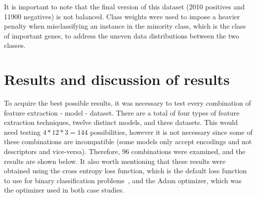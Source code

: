 It is important to note that the final version of this dataset (2010 positives and 11900 negatives) is not balanced. Class weights were used to impose a heavier penalty when misclassifying an instance in the minority class, which is the class of important genes, to address the uneven data distributions between the two classes.

\section{Results and discussion of results}

To acquire the best possible results, it was necessary to test every combination of feature extraction - model - dataset. There are a total of four types of feature extraction techniques, twelve distinct models, and three datasets. This would need testing $4*12*3 = 144$ possibilities, however it is not necessary since some of these combinations are incompatible (some models only accept encodings and not descriptors and vice-versa). Therefore, 96 combinations were examined, and the results are shown below. It also worth mentioning that these results were obtained using the cross entropy loss function, which is the default loss function to use for binary classification problems~\cite{BrownleeHowNetworks}, and the Adam optimizer, which was the optimizer used in both case studies.

